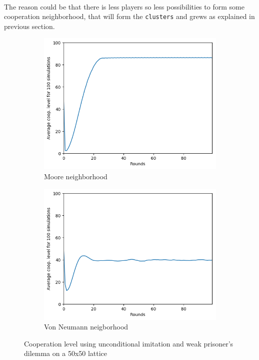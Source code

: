 \documentclass[letterpaper]{article}
\begin{document}
\paragraph{}

The reason could be that there is less players so less possibilities to
form some cooperation neighborhood, that will form the \texttt{clusters}
and grews as explained in previous section.

\begin{figure}
    \begin{subfigure}{.5\textwidth}
        \centering
        \includegraphics[width=1\linewidth]{images/assign2/50-part1}
        \caption{Moore neighborhood}
        \label{fig:50moorepart1}
    \end{subfigure}
    \begin{subfigure}{.5\textwidth}
        \centering
        \includegraphics[width=1\linewidth]{images/assign2/50_vonneumann-part1}
        \caption{Von Neumann neigborhood}
        \label{fig:50vonpart1}
    \end{subfigure}
    \caption{Cooperation level using unconditional imitation and
    weak prisoner's dilemma on a 50x50 lattice}
    \label{fig:50part1}
\end{figure}
\end{document}
